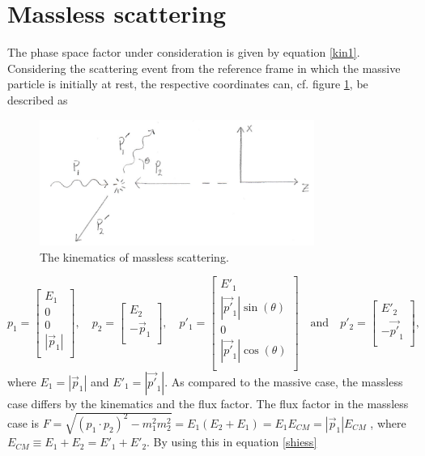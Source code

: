 \section{Massless scattering}
The phase space factor under consideration is given by equation \eqref{kin1}. Considering the scattering event from the reference frame in which the massive particle is initially at rest, the respective coordinates can, cf. figure \ref{fig:11}, be described as
\begin{figure}[H]
	\captionsetup{width=1\textwidth}
	\centering
	\includegraphics[width=0.8\textwidth]{figures/scat4}
	\caption{The kinematics of massless scattering.}
	\label{fig:11}
\end{figure}
\begin{equation}
	p_1=\begin{bmatrix}
		E_1 \\ 0\\ 0 \\ |\vec{p}_1| \\
	\end{bmatrix} ,\quad
	p_2=\begin{bmatrix}
		E_2 \\ -\vec{p}_1\\
	\end{bmatrix},\quad 
	p'_1=\begin{bmatrix}
		E'_1 \\ |\vec{p'}_1| \sin(\theta)\\ 0 \\ |\vec{p'}_1|\cos(\theta) \\
	\end{bmatrix} \quad \text{and}\quad
	p'_2=\begin{bmatrix}
		E'_2 \\ -\vec{p'}_1\\
	\end{bmatrix}, 
\end{equation} 
where $E_1=|\vec{p}_1|$ and $E'_1=|\vec{p'}_1|$.	As compared to the massive case, the massless case differs by the kinematics and the flux factor. The flux factor in the massless case is $F=\sqrt{(p_1\cdot p_2)^2-m_1^2m_2^2}=E_1 (E_2+E_1)=E_1E_{CM}=|\vec{p}_1|E_{CM}$ , where $E_{CM}\equiv E_1+E_2=E'_1+E'_2$. By using this in equation \eqref{shiess}
